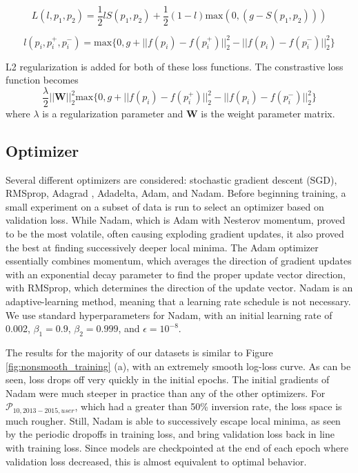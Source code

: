 \begin{equation} \label{eq:hadsell_loss}
L(l, p_1, p_2) = \dfrac{1}{2}lS(p_1, p_2) + \dfrac{1}{2}(1-l)\text{max}(0, (g-S(p_1,p_2)))
\end{equation}

\begin{equation} \label{eq:Wang_loss}
l(p_i, p_i^+, p_i^-) = \text{max}\{0, g + ||f(p_i) - f(p_i^+)||_2^2 - ||f(p_i)-f(p_i^-)||_2^2\}
\end{equation}

L2 regularization is added for both of these loss functions. The constrastive loss function becomes
\begin{equation}
\dfrac{\lambda}{2}||\mathbf{W}||_2^2 \text{max}\{0, g + ||f(p_i) - f(p_i^+)||_2^2 - ||f(p_i)-f(p_i^-)||_2^2\}
\end{equation}
where $\lambda$ is a regularization parameter and $\mathbf{W}$ is the weight parameter matrix.

\subsection{Optimizer}

Several different optimizers are considered: stochastic gradient descent (SGD), RMSprop\cite{tieleman2012lecture}, Adagrad \cite{duchi2011adaptive}, Adadelta\cite{zeiler2012adadelta}, Adam\cite{kingma2014adam}, and Nadam\cite{kingma2014adam}. Before beginning training, a small experiment on a subset of data is run to select an optimizer based on validation loss. While Nadam, which is Adam with Nesterov momentum, proved to be the most volatile, often causing exploding gradient updates, it also proved the best at finding successively deeper local minima. The Adam optimizer essentially combines momentum, which averages the direction of gradient updates with an exponential decay parameter to find the proper update vector direction, with RMSprop, which determines the direction of the update vector. Nadam is an adaptive-learning method, meaning that a learning rate schedule is not necessary. We use standard hyperparameters for Nadam, with an initial learning rate of 0.002, $\beta_1=0.9$, $\beta_2=0.999$, and $\epsilon=10^{-8}$.

The results for the majority of our datasets is similar to Figure \ref{fig:nonsmooth_training} (a), with an extremely smooth log-loss curve. As can be seen, loss drops off very quickly in the initial epochs. The initial gradients of Nadam were much steeper in practice than any of the other optimizers. For $\mathcal{P}_{10,2013-2015,user}$, which had a greater than 50\% inversion rate, the loss space is much rougher. Still, Nadam is able to successively escape local minima, as seen by the periodic dropoffs in training loss, and bring validation loss back in line with training loss. Since models are checkpointed at the end of each epoch where validation loss decreased, this is almost equivalent to optimal behavior.

